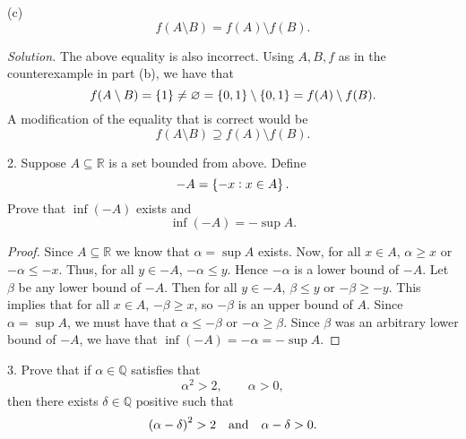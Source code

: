 \documentclass{article}
\newcommand{\Q}{\mathbb{Q}}
\newcommand{\R}{\mathbb{R}}
\begin{document}
\vspace{3mm}

(c)
%
\begin{equation*}
    f(A \setminus B) = f(A) \setminus f(B)
    .
\end{equation*}

\textit{Solution.} The above equality is also incorrect. Using $A, B, f$
as in the counterexample in part (b), we have that
%
\begin{equation*}
    f(A \setminus B)
        = \cbr{1}
        \neq \varnothing
        = \cbr{0, 1} \setminus \cbr{0, 1}
        = f(A) \setminus f(B)
    .
\end{equation*}
%
A modification of the equality that is correct would be
%
\begin{equation*}
    f(A \setminus B) \supseteq f(A) \setminus f(B)
    .
\end{equation*}

\newpage

2. Suppose $A \subseteq \R$ is a set bounded from above. Define
%
\begin{equation*}
   -A = \cbr{-x : x \in A}
   .
\end{equation*}
%
Prove that $\inf(-A)$ exists and
%
\begin{equation*}
    \inf(-A) = -\sup A
    .
\end{equation*}

\begin{proof}

Since $A \subseteq \R$ we know that $\alpha = \sup A$ exists. Now, for
all $x \in A$, $\alpha \geq x$ or $-\alpha \leq -x$. Thus, for all $y
\in -A$, $-\alpha \leq y$. Hence $-\alpha$ is a lower bound of $-A$. Let
$\beta$ be any lower bound of $-A$. Then for all $y \in -A$, $\beta \leq
y$ or $-\beta \geq -y$. This implies that for all $x \in A$, $-\beta
\geq x$, so $-\beta$ is an upper bound of $A$. Since $\alpha = \sup A$,
we must have that $\alpha \leq -\beta$ or $-\alpha \geq \beta$. Since
$\beta$ was an arbitrary lower bound of $-A$, we have that $\inf(-A) =
-\alpha = - \sup A$.

\end{proof}

\newpage

3. Prove that if $\alpha \in \Q$ satisfies that
%
\begin{equation}
    \alpha^2 > 2, \qquad \alpha > 0
    ,
    \label{eq:q3-1}
\end{equation}
%
then there exists $\delta \in \Q$ positive such that
%
\begin{equation}
    \del{\alpha - \delta}^2 > 2
    \quad \text{and} \quad \alpha - \delta > 0
    .
    \label{eq:q3-2}
\end{equation}
\end{document}
